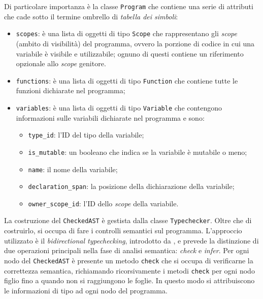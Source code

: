 

Di particolare importanza \`e la classe \texttt{Program} che contiene una serie di attributi che cade sotto il termine ombrello di \emph{tabella dei simboli}:
\begin{itemize}
	\item \texttt{scopes}: \`e una lista di oggetti di tipo \texttt{Scope} che rappresentano gli \emph{scope} (ambito di visibilit\`a) del programma, ovvero la porzione di codice in cui una variabile \`e visibile e utilizzabile; ognuno di questi contiene un riferimento opzionale allo \textit{scope} genitore.
	\item \texttt{functions}: \`e una lista di oggetti di tipo \texttt{Function} che contiene tutte le funzioni dichiarate nel programma;
	\item \texttt{variables}: è una lista di oggetti di tipo \texttt{Variable} che contengono informazioni sulle variabili dichiarate nel programma e sono:
	\begin{itemize}
		\item \texttt{type\_id}: l'ID del tipo della variabile;
		\item \texttt{is\_mutable}: un booleano che indica se la variabile \`e mutabile o meno;
		\item \texttt{name}: il nome della variabile;
		\item \texttt{declaration\_span}: la posizione della dichiarazione della variabile;
		\item \texttt{owner\_scope\_id}: l'ID dello \emph{scope} della variabile.
	\end{itemize}
\end{itemize}


La costruzione del \texttt{CheckedAST} \`e gestista dalla classe \texttt{Typechecker}. Oltre che di costruirlo, si occupa di fare i controlli semantici sul programma. L'approccio utilizzato \`e il \emph{bidirectional typechecking}, introdotto da \cite{pierce2000local}, e prevede la distinzione di due operazioni principali nella fase di analisi semantica: \emph{check} e \emph{infer}. Per ogni nodo del \texttt{CheckedAST} \`e presente un metodo \texttt{check} che si occupa di verificarne la correttezza semantica, richiamando ricorsivamente i metodi \texttt{check} per ogni nodo figlio fino a quando non si raggiungono le foglie. In questo modo si attribuiscono le informazioni di tipo ad ogni nodo del programma.

